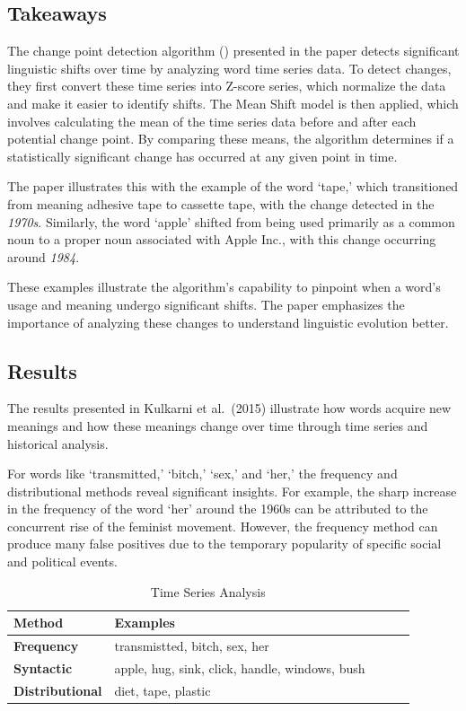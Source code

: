 \subsection{Takeaways}\label{subsec:takeaways2}
The change point detection algorithm () presented in the paper detects significant linguistic shifts over time by analyzing word time series data.
To detect changes, they first convert these time series into Z-score series, which normalize the data and make it easier to identify shifts.
The Mean Shift model is then applied, which involves calculating the mean of the time series data before and after each potential change point.
By comparing these means, the algorithm determines if a statistically significant change has occurred at any given point in time.

The paper illustrates this with the example of the word `tape,' which transitioned from meaning adhesive tape to cassette tape, with the change detected in the \emph{1970s}.
Similarly, the word `apple' shifted from being used primarily as a common noun to a proper noun associated with Apple Inc., with this change occurring around \emph{1984}.

These examples illustrate the algorithm’s capability to pinpoint when a word’s usage and meaning undergo significant shifts.
The paper emphasizes the importance of analyzing these changes to understand linguistic evolution better.

\subsection{Results} \label{subsec:kulkarni-results}

The results presented in Kulkarni et al.\ (2015) illustrate how words acquire new meanings and how these meanings change over time through time series and historical analysis.

For words like `transmitted,' `bitch,' `sex,' and `her,' the frequency and distributional methods reveal significant insights.
For example, the sharp increase in the frequency of the word `her' around the 1960s can be attributed to the concurrent rise of the feminist movement.
However, the frequency method can produce many false positives due to the temporary popularity of specific social and political events.

\begin{table}[tbh]
\begin{tabular}{@{}lllll@{}}
\toprule
\textbf{Method}         & \textbf{Examples}                              &  &  &  \\ \midrule
\textbf{Frequency}      & transmistted, bitch, sex, her                  &  &  &  \\
\textbf{Syntactic}      & apple, hug, sink, click, handle, windows, bush &  &  &  \\
\textbf{Distributional} & diet, tape, plastic                            &  &  &  \\ \bottomrule
\end{tabular}
\caption{Time Series Analysis}
\label{tab:time-series-examples}
\end{table}
\raggedbottom

